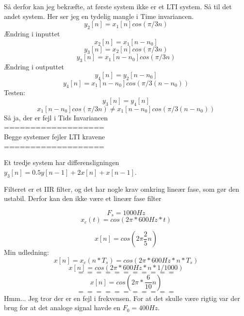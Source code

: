 \begin{EksamensOpgaver}
\begin{Eksamenssæt}[2022]
\begin{eksamensOpgave}
\begin{UnderOpgave}
                Så derfor kan jeg bekræfte, at første system ikke er et LTI system.
                Så til det andet system.
                Her ser jeg en tydelig mangle i Time invariancen.
                \[y_2[n] = x_1[n]cos(\pi/3 n)\]
                Ændring i inputtet
                \[x_2[n] = x_1[n - n_0]\]
                \[y_3[n] = x_2[n]cos(\pi/3 n)\]
                \[y_3[n] = x_1[n - n_0]cos(\pi/3 n)\]
                Ændring i outputtet
                \[y_4[n] = y_2[n - n_0]\]
                \[y_4[n] = x_1[n - n_0]cos(\pi/3 (n - n_0))\]
                Testen: 
                \[y_3[n] = y_4[n]\]
                \[x_1[n - n_0]cos(\pi/3 n) \neq x_1[n - n_0]cos(\pi/3 (n - n_0))\]
                Så ja, der er fejl i Tids Invariancen\\
                ===================\\
                Begge systemer fejler LTI kravene\\
                ===================\\
            \end{UnderOpgave}
            Et tredje system har differensligningen $y_3[n] = 0.5y[n - 1] + 2x[n] + x[n - 1]$.
            \begin{UnderOpgave}
                Filteret er et IIR filter, og det har nogle krav omkring lineær fase, som gør den ustabil. 
                Derfor kan den ikke være et lineær fase filter         
            \end{UnderOpgave}
        \end{eksamensOpgave}
        \begin{eksamensOpgave}
            \[F_s = 1000Hz\]
            \[x_c(t) = cos(2\pi * 600Hz * t)\]
            \begin{UnderOpgave}
                \[x[n] = cos(2\pi \frac{2}{5} n)\]
                Min udledning: 
                \[x[n] = x_c(n * T_s) = cos(2\pi * 600Hz * n * T_s)\]
                \[x[n] = cos(2\pi * 600Hz * n * 1/1000)\]
                \[===========\]
                \[x[n] = cos(2\pi * \frac{6}{10} n )\]
                \[===========\]
                Hmm... Jeg tror der er en fejl i frekvensen. For at det skulle være rigtig var der brug for at det analoge signal havde en $F_0 = 400Hz$.
            \end{UnderOpgave}
            \begin{UnderOpgave}

\end{UnderOpgave}
\end{eksamensOpgave}
\end{Eksamenssæt}
\end{EksamensOpgaver}
